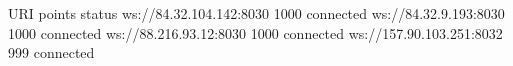 \begin{shellbox}\begin{ttlst}
          URI             points   status  
ws://84.32.104.142:8030     1000  connected
 ws://84.32.9.193:8030      1000  connected
 ws://88.216.93.12:8030     1000  connected
ws://157.90.103.251:8032     999  connected
\end{ttlst}\end{shellbox}
